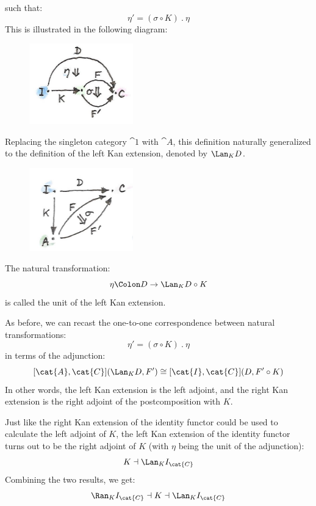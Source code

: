 \noindent
such that:
\[\eta' = (\sigma \circ K)\ .\ \eta\]
This is illustrated in the following diagram:

\begin{figure}[H]
\centering
\includegraphics[width=0.4\textwidth]{images/kan112.jpg}
\end{figure}

\noindent
Replacing the singleton category $\cat{1}$ with $\cat{A}$, this
definition naturally generalized to the definition of the left Kan
extension, denoted by $\Lan_{K}D$.

\begin{figure}[H]
\centering
\includegraphics[width=0.4\textwidth]{images/kan12.jpg}
\end{figure}

\noindent
The natural transformation:
\[\eta \Colon D \to \Lan_{K}D \circ K\]
is called the unit of the left Kan extension.

As before, we can recast the one-to-one correspondence between natural
transformations:
\[\eta' = (\sigma \circ K)\ .\ \eta\]
in terms of the adjunction:
\[[\cat{A}, \cat{C}](\Lan_{K}D, F') \cong [\cat{I}, \cat{C}](D, F' \circ K)\]
In other words, the left Kan extension is the left adjoint, and the
right Kan extension is the right adjoint of the postcomposition with
$K$.

Just like the right Kan extension of the identity functor could be used
to calculate the left adjoint of $K$, the left Kan extension of
the identity functor turns out to be the right adjoint of $K$
(with $\eta$ being the unit of the adjunction):
\[K \dashv \Lan_{K}I_{\cat{C}}\]
Combining the two results, we get:
\[\Ran_{K}I_{\cat{C}} \dashv K \dashv \Lan_{K}I_{\cat{C}}\]

